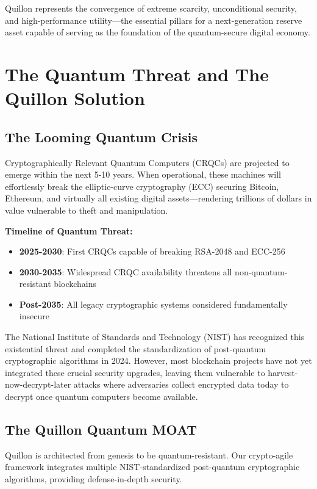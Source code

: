 \documentclass[11pt,a4paper]{scrartcl}
\begin{document}
Quillon represents the convergence of extreme scarcity, unconditional security, and high-performance utility—the essential pillars for a next-generation reserve asset capable of serving as the foundation of the quantum-secure digital economy.

\newpage

\section{The Quantum Threat and The Quillon Solution}

\subsection{The Looming Quantum Crisis}

Cryptographically Relevant Quantum Computers (CRQCs) are projected to emerge within the next 5-10 years. When operational, these machines will effortlessly break the elliptic-curve cryptography (ECC) securing Bitcoin, Ethereum, and virtually all existing digital assets—rendering trillions of dollars in value vulnerable to theft and manipulation.

\textbf{Timeline of Quantum Threat:}
\begin{itemize}
\item \textbf{2025-2030}: First CRQCs capable of breaking RSA-2048 and ECC-256
\item \textbf{2030-2035}: Widespread CRQC availability threatens all non-quantum-resistant blockchains
\item \textbf{Post-2035}: All legacy cryptographic systems considered fundamentally insecure
\end{itemize}

The National Institute of Standards and Technology (NIST) has recognized this existential threat and completed the standardization of post-quantum cryptographic algorithms in 2024. However, most blockchain projects have not yet integrated these crucial security upgrades, leaving them vulnerable to harvest-now-decrypt-later attacks where adversaries collect encrypted data today to decrypt once quantum computers become available.

\subsection{The Quillon Quantum MOAT}

Quillon is architected from genesis to be quantum-resistant. Our crypto-agile framework integrates multiple NIST-standardized post-quantum cryptographic algorithms, providing defense-in-depth security.
\end{document}
